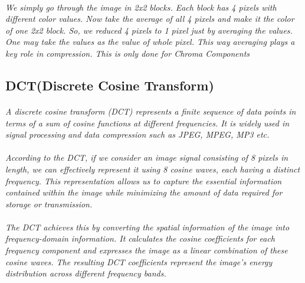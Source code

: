\documentclass[12pt, letterpaper]{article}
\begin{document}
\paragraph{}\textit{We simply go through the image in 2x2 blocks. Each block has 4 pixels with different color values. Now take the average of all 4 pixels and make it the color of one 2x2 block. So, we reduced 4 pixels to 1 pixel just by averaging the values. One may take the values as the value of whole pixel. This way averaging plays a key role in compression. This is only done for Chroma Components}
\subsection{DCT(Discrete Cosine Transform)}
\paragraph{}\textit{A discrete cosine transform (DCT) represents a finite sequence of data points in terms of a sum of cosine functions at different frequencies. It is widely used in signal processing and data compression such as JPEG, MPEG, MP3 etc.}
\paragraph{}\textit{According to the DCT, if we consider an image signal consisting of 8 pixels in length, we can effectively represent it using 8 cosine waves, each having a distinct frequency. This representation allows us to capture the essential information contained within the image while minimizing the amount of data required for storage or transmission. }
\paragraph{}\textit{The DCT achieves this by converting the spatial information of the image into frequency-domain information. It calculates the cosine coefficients for each frequency component and expresses the image as a linear combination of these cosine waves. The resulting DCT coefficients represent the image's energy distribution across different frequency bands.}
\end{document}
